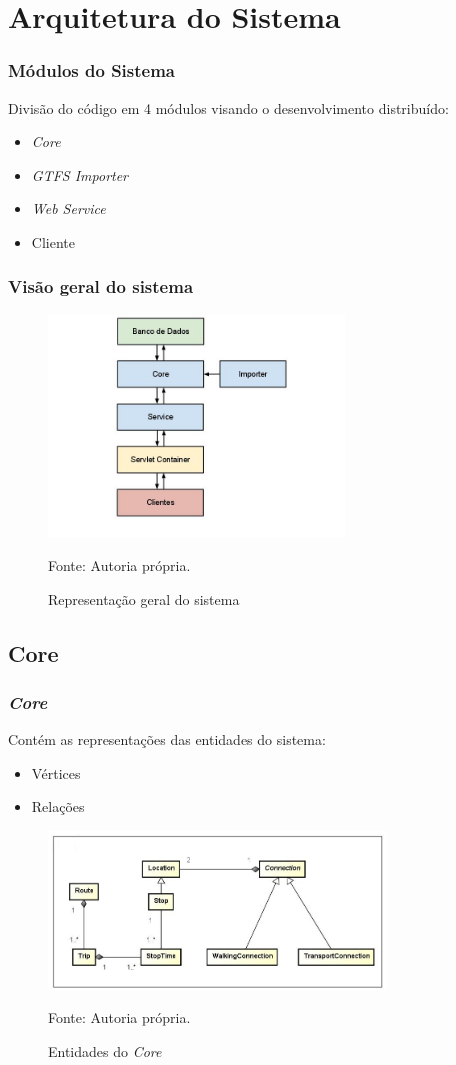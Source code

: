 \section{Arquitetura do Sistema}
\frame
{
\frametitle{Módulos do Sistema}
Divisão do código em 4 módulos visando o desenvolvimento distribuído:
\begin{itemize}
\item \emph{Core}
\item \emph{GTFS Importer}
\item \emph{Web Service}
\item Cliente
\end{itemize}
}

\frame
{
\frametitle{Visão geral do sistema}
\begin{figure}
\includegraphics[width=0.7\textwidth]{./imgs/arquitetura.png}
\caption{Representação geral do sistema}
\tiny
Fonte: Autoria própria.
\end{figure}

}

\subsection{Core}
\frame
{
\frametitle{\emph{Core}}
Contém as representações das entidades do sistema:
\begin{itemize}
\item Vértices
\item Relações
\end{itemize}
\begin{figure}
\includegraphics[width=0.8\textwidth]{./imgs/CoreDiagram.png}
\caption{Entidades do \emph{Core}}
\tiny
Fonte: Autoria própria.
\end{figure}

}

